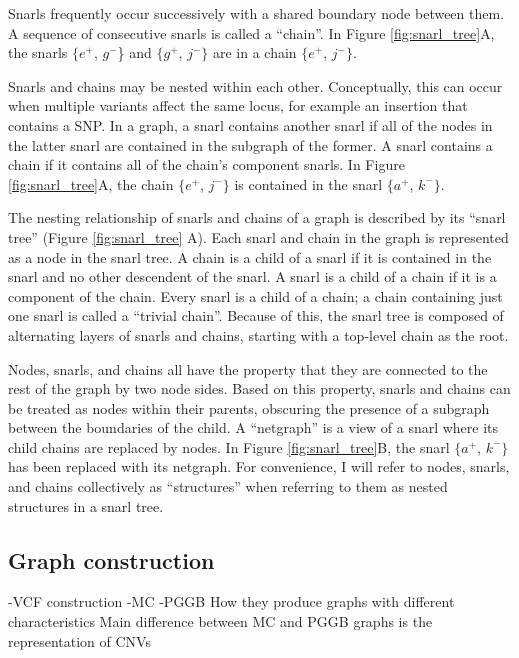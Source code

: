 \documentclass[11pt]{ucscthesis}
\begin{document}
Snarls frequently occur successively with a shared boundary node between them.
A sequence of consecutive snarls is called a ``chain''.
In Figure \ref{fig:snarl_tree}A, the snarls $\{e^+$, $g^-$\} and $\{g^+$, $j^-\}$ are in a chain $\{e^+$, $j^-\}$.

Snarls and chains may be nested within each other.
Conceptually, this can occur when multiple variants affect the same locus, for example an insertion that contains a SNP.
In a graph, a snarl contains another snarl if all of the nodes in the latter snarl are contained in the subgraph of the former.
A snarl contains a chain if it contains all of the chain's component snarls.
In Figure \ref{fig:snarl_tree}A, the chain $\{e^+$, $j^-\}$ is contained in the snarl $\{a^+$, $k^-\}$.

The nesting relationship of snarls and chains of a graph is described by its ``snarl tree'' (Figure \ref{fig:snarl_tree} A).
Each snarl and chain in the graph is represented as a node in the snarl tree.
A chain is a child of a snarl if it is contained in the snarl and no other descendent of the snarl.
A snarl is a child of a chain if it is a component of the chain.
Every snarl is a child of a chain; a chain containing just one snarl is called a ``trivial chain''.
Because of this, the snarl tree is composed of alternating layers of snarls and chains, starting with a top-level chain as the root.

Nodes, snarls, and chains all have the property that they are connected to the rest of the graph by two node sides.
Based on this property, snarls and chains can be treated as nodes within their parents, obscuring the presence of a subgraph between the boundaries of the child.
A ``netgraph'' is a view of a snarl where its child chains are replaced by nodes.
In Figure \ref{fig:snarl_tree}B, the snarl $\{a^+$, $k^-\}$ has been replaced with its netgraph.
For convenience, I will refer to nodes, snarls, and chains collectively as ``structures'' when referring to them as nested structures in a snarl tree.

\subsection{Graph construction}
\label{sec:graph-construction}
-VCF construction
-MC
-PGGB
How they produce graphs with different characteristics
Main difference between MC and PGGB graphs is the representation of CNVs
\end{document}
